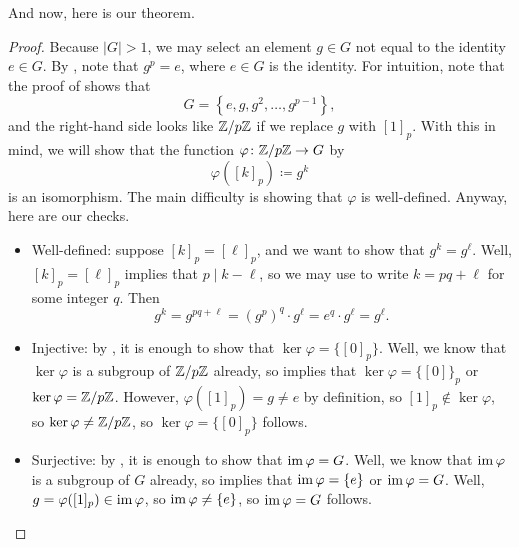 \documentclass[../main.tex]{subfiles}
\begin{document}
And now, here is our theorem.
\groupsofordp*
\begin{proof}
    Because $\left|G\right|>1$, we may select an element $g\in G$ not equal to the identity $e\in G$. By , note that $g^p=e$, where $e\in G$ is the identity. For intuition, note that the proof of  shows that
    \[G=\left\{e,g,g^2,\ldots,g^{p-1}\right\},\]
    and the right-hand side looks like $\mathbb Z/p\mathbb Z$ if we replace $g$ with $[1]_p$. With this in mind, we will show that the function $\varphi\colon\mathbb Z/p\mathbb Z\to G$ by
    \[\varphi([k]_p)\coloneqq g^k\]
    is an isomorphism. The main difficulty is showing that $\varphi$ is well-defined. Anyway, here are our checks.
    \begin{itemize}
        \item Well-defined: suppose $[k]_p=[\ell]_p$, and we want to show that $g^k=g^\ell$. Well, $[k]_p=[\ell]_p$ implies that $p\mid k-\ell$, so we may use  to write $k=pq+\ell$ for some integer $q$. Then
        \[g^k=g^{pq+\ell}=\left(g^p\right)^q\cdot g^\ell=e^q\cdot g^\ell=g^\ell.\]
        \item Injective: by , it is enough to show that $\ker\varphi=\{[0]_p\}$. Well, we know that $\ker\varphi$ is a subgroup of $\mathbb Z/p\mathbb Z$ already, so  implies that $\ker\varphi=\{[0]\}_p$ or $\ker\varphi=\mathbb Z/p\mathbb Z$. However, $\varphi([1]_p)=g\ne e$ by definition, so $[1]_p\notin\ker\varphi$, so $\ker\varphi\ne\mathbb Z/p\mathbb Z$, so $\ker\varphi=\{[0]_p\}$ follows.
        \item Surjective: by , it is enough to show that $\operatorname{im}\varphi=G$. Well, we know that $\operatorname{im}\varphi$ is a subgroup of $G$ already, so  implies that $\operatorname{im}\varphi=\{e\}$ or $\operatorname{im}\varphi=G$. Well, $g=\varphi([1]_p)\in\operatorname{im}\varphi$, so $\operatorname{im}\varphi\ne\{e\}$, so $\operatorname{im}\varphi=G$ follows.
        \qedhere
    \end{itemize}
\end{proof}

\end{document}
